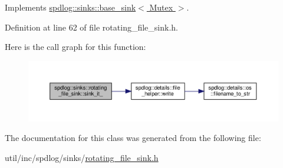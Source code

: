 Implements \hyperlink{classspdlog_1_1sinks_1_1base__sink_ad698d300cb7f5e58b2aa1b9907cdbd87}{spdlog\+::sinks\+::base\+\_\+sink$<$ Mutex $>$}.



Definition at line 62 of file rotating\+\_\+file\+\_\+sink.\+h.

Here is the call graph for this function\+:
\nopagebreak
\begin{figure}[H]
\begin{center}
\leavevmode
\includegraphics[width=350pt]{classspdlog_1_1sinks_1_1rotating__file__sink_a3cf93e445ad92380c7d352f971cd76a4_cgraph}
\end{center}
\end{figure}


The documentation for this class was generated from the following file\+:\begin{DoxyCompactItemize}
\item 
util/inc/spdlog/sinks/\hyperlink{rotating__file__sink_8h}{rotating\+\_\+file\+\_\+sink.\+h}\end{DoxyCompactItemize}
